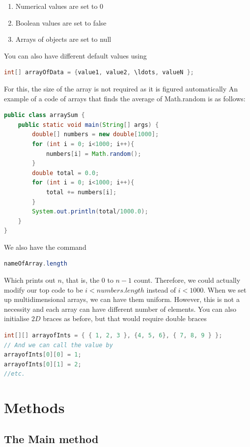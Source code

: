 \documentclass[11pt,a4 paper]{book}
\theoremstyle{plain}
\theoremstyle{definition}
\theoremstyle{remark}
\begin{document}
\begin{flushleft}
\begin{enumerate}
	\item Numerical values are set to $0$ 
	\item Boolean values are set to false
	\item Arrays of objects are set to null
\end{enumerate}
You can also have different default values using
\begin{lstlisting}[language = Java]
int[] arrayOfData = {value1, value2, \ldots, valueN };
\end{lstlisting}
For this, the size of the array is not required as it is figured automatically
An example of a code of arrays that finds the average of Math.random is as follows:
\begin{lstlisting}[language = Java]
public class arraySum {
    public static void main(String[] args) {
        double[] numbers = new double[1000];
        for (int i = 0; i<1000; i++){
            numbers[i] = Math.random();
        }
        double total = 0.0;
        for (int i = 0; i<1000; i++){
            total += numbers[i];
        }
        System.out.println(total/1000.0);
    }
}
\end{lstlisting}
We also have the command
\begin{lstlisting}[language = Java]
nameOfArray.length
\end{lstlisting}
Which prints out $n$, that is, the $0$ to $n-1$ count. Therefore, we could actually modify our top code to be $i < numbers.length$ instead of $i < 1000$.
When we set up multidimensional arrays, we can have them uniform. However, this is not a necessity and each array can have different number of elements.
You can also initialise $2D$ braces as before, but that would require double braces
\begin{lstlisting}[language = Java]
int[][] arrayofInts = { { 1, 2, 3 }, {4, 5, 6}, { 7, 8, 9 } };
// And we can call the value by
arrayofInts[0][0] = 1;
arrayofInts[0][1] = 2;
//etc.
\end{lstlisting}
\section{Methods}
\subsection{The Main method}


\end{flushleft}
\end{document}

